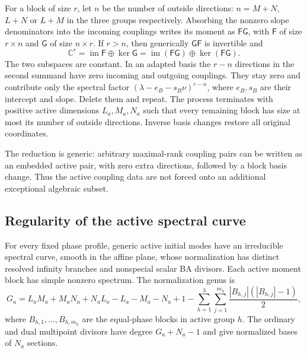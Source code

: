 For a block of size $r$, let $n$ be the number of outside directions:
$n=M+N$, $L+N$ or $L+M$ in the three groups respectively. Absorbing the
nonzero slope denominators into the incoming couplings writes its
moment as $\mathsf F\mathsf G$, with $\mathsf F$ of size $r\times n$ and $\mathsf G$ of size
$n\times r$. If $r>n$, then generically $\mathsf G\mathsf F$ is invertible and
\begin{equation}\label{eq:BA-inactive-splitting}
 \mathbb C^r=\operatorname{im}\mathsf F\oplus\ker\mathsf G
             =\operatorname{im}(\mathsf F\mathsf G)\oplus\ker(\mathsf F\mathsf G).
\end{equation}
The two subspaces are constant. In an adapted basis the $r-n$
directions in the second summand have zero incoming and outgoing
couplings. They stay zero and contribute only the spectral factor
$(\lambda-e_B-s_B\nu)^{r-n}$, where $e_B,s_B$ are their intercept
and slope. Delete them and repeat. The process terminates with
positive active dimensions $L_a,M_a,N_a$ such that every remaining block
has size at most its number of outside directions. Inverse basis
changes restore all original coordinates.

The reduction is generic: arbitrary maximal-rank coupling pairs can
be written as an embedded active pair, with zero extra directions,
followed by a block basis change. Thus the active coupling data are
not forced onto an additional exceptional algebraic subset.

\subsection{Regularity of the active spectral curve}

\begin{proposition}\label{prop:BA-active-regularity}
For every fixed phase profile, generic active initial modes have an
irreducible spectral curve, smooth in the affine plane, whose
normalization has distinct resolved infinity branches and nonspecial
scalar BA divisors. Each active moment block has simple nonzero
spectrum. The normalization genus is
\begin{equation}\label{eq:BA-active-genus}
 G_a=L_aM_a+M_aN_a+N_aL_a-L_a-M_a-N_a+1
 -\sum_{h=1}^{3}\sum_{j=1}^{m_h}
       \frac{|B_{h,j}|(|B_{h,j}|-1)}2,
\end{equation}
where $B_{h,1},\ldots,B_{h,m_h}$ are the equal-phase blocks in active
group $h$. The ordinary and dual multipoint divisors have degree
$G_a+N_a-1$ and give normalized bases of $N_a$ sections.
\end{proposition}

